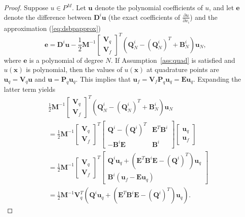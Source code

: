 \documentclass{svjour3}                     %
\newcommand{\pd}[2]{\frac{\partial#1}{\partial#2}}
\newcommand{\LRp}[1]{\left( #1 \right)}
\newcommand{\LRs}[1]{\left[ #1 \right]}
\begin{document}
\begin{proof}
Suppose $u \in P^M$.  Let $\bm{u}$ denote the polynomial coefficients of $u$, and let $\bm{e}$ denote the difference between $\bm{D}^i\bm{u}$ (the exact coefficients of $\pd{u}{x_i}$) and the approximation (\ref{eq:dsbpapprox})
\[
\bm{e} = \bm{D}^i\bm{u} - \frac{1}{2}\bm{M}^{-1}\LRs{\begin{array}{c}
\bm{V}_q \\ \bm{V}_f\end{array}}^T\LRp{\bm{Q}^i_N - \LRp{\bm{Q}^i_N}^T + \bm{B}^i_N}\bm{u}_N,
\]
where $\bm{e}$ is a polynomial of degree $N$.  
If Assumption~\ref{ass:quad} is satisfied and $u(\bm{x})$ is polynomial, then the values of $u(\bm{x})$ at quadrature points are $\bm{u}_q = \bm{V}_q\bm{u}$ and $\bm{u} = \bm{P}_q\bm{u}_q$.  This implies that $\bm{u}_f = \bm{V}_f \bm{P}_q\bm{u}_q =  \bm{E}\bm{u}_q$.  Expanding the latter term yields 
\begin{align*}
&\frac{1}{2}\bm{M}^{-1}\LRs{\begin{array}{c}
\bm{V}_q \\ \bm{V}_f\end{array}}^T\LRp{\bm{Q}^i_N - \LRp{\bm{Q}^i_N}^T + \bm{B}^i_N}\bm{u}_N \\
&= \frac{1}{2}\bm{M}^{-1}\LRs{\begin{array}{c}
\bm{V}_q \\ \bm{V}_f\end{array}}^T\begin{bmatrix}
\bm{Q}^i - \LRp{\bm{Q}^i}^T & \bm{E}^T\bm{B}^i\\
-\bm{B}^i\bm{E} & \bm{B}^i
\end{bmatrix}\begin{bmatrix}
\bm{u}_q\\
\bm{u}_f
\end{bmatrix}\\
&= \frac{1}{2}\bm{M}^{-1}\LRs{\begin{array}{c}
\bm{V}_q \\ \bm{V}_f\end{array}}^T\begin{bmatrix}
\bm{Q}^i\bm{u}_q + \LRp{\bm{E}^T\bm{B}^i\bm{E} - \LRp{\bm{Q}^i}^T}\bm{u}_q\\
\bm{B}^i\LRp{\bm{u}_f - \bm{E}\bm{u}_q}
\end{bmatrix} 
\\
&=\frac{1}{2}\bm{M}^{-1}
\bm{V}_q^T\LRp{\bm{Q}^i\bm{u}_q + \LRp{\bm{E}^T\bm{B}^i\bm{E} - \LRp{\bm{Q}^i}^T}\bm{u}_q}.

\end{align*}
\end{proof}
\end{document}
